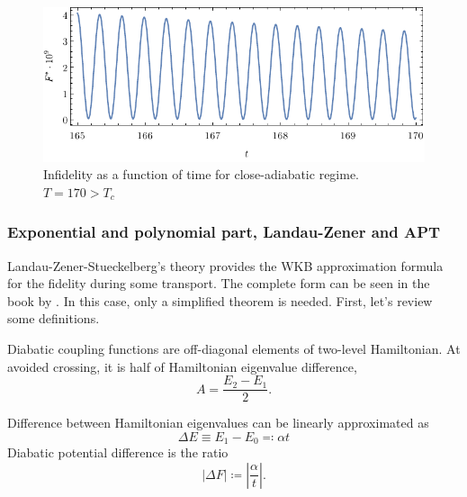 \begin{figure}[h]
    \centering
    \includegraphics[scale=1.2]{../img/overcritical.pdf}
    \caption{Infidelity as a function of time for close-adiabatic regime. $T=170>T_c$}
    \label{fig:overcritical}
\end{figure}

\subsubsection{Exponential and polynomial part, Landau-Zener and APT}
Landau-Zener-Stueckelberg's theory provides the WKB approximation formula for the fidelity during some transport. The complete form can be seen in the book by \citet{nonadiabaticTransition}. In this case, only a simplified theorem is needed. First, let's review some definitions.

\begin{definition}
    Diabatic coupling functions are off-diagonal elements of two-level Hamiltonian. At avoided crossing, it is half of Hamiltonian eigenvalue difference,
    \begin{equation}
        A=\frac{E_2-E_1}{2}.
    \end{equation}
\end{definition}
\begin{definition}
    Difference between Hamiltonian eigenvalues can be linearly approximated as
    \begin{equation}
        \Delta E\equiv E_1-E_0 \eqqcolon \alpha t
    \end{equation}
    Diabatic potential difference is the ratio
    \begin{equation}
        |\Delta F|\coloneqq \left|\frac{\alpha}{t}\right|.
    \end{equation}
\end{definition}

